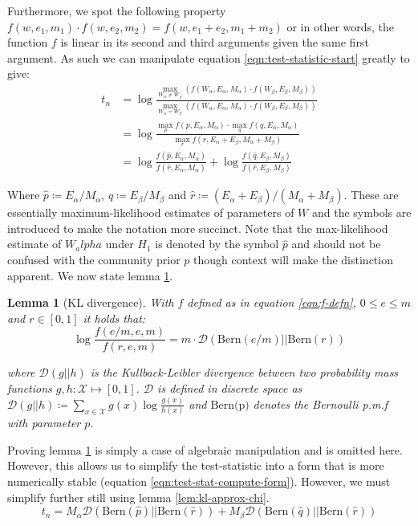 \documentclass[]{article}
\newcommand{\Xcal}{\mathcal{X}}
\newcommand{\kl}{\mathcal{D}}
\newtheorem{lemma}[theorem]{Lemma}
\begin{document}
\begin{multicols*}{2}
Furthermore, we spot the following property $f(w, e_1, m_1) \cdot f(w, e_2, m_2) = f(w, e_1 + e_2, m_1 + m_2)$ or in other words, the function $f$ is linear in its second and third arguments given the same first argument. As such we can manipulate equation \ref{eqn:test-statistic-start} greatly to give:
%
\begin{align}
	t_n &= \log \frac
	{
		\max_{W_{\alpha} \neq W_{\beta}}(f (W_\alpha, E_\alpha, M_\alpha) \cdot f (W_\beta, E_\beta, M_\beta))
	}
	{
		\max_{W_\alpha = W_\beta} (f (W_\alpha, E_\alpha, M_\alpha) \cdot f (W_\beta, E_\beta, M_\beta))
	} \nonumber \\
	&= \log \frac{
		\max_p f(p, E_\alpha, M_\alpha) \cdot \max_q f(q, E_\alpha, M_\alpha)
	}{
		\max_r f(r, E_\alpha + E_\beta, M_\alpha + M_\beta)
	} \nonumber \\
	&= \log \frac{f(\hat{p}, E_\alpha, M_\alpha)}{f(\hat{r}, E_\alpha, M_\alpha)} + \log \frac{f(\hat{q}, E_\beta, M_\beta)}{f(\hat{r}, E_\beta, M_\beta)}
\end{align}

Where $\hat{p} \coloneqq E_\alpha / M_\alpha$, $\hat{q} \coloneqq E_\beta / M_\beta$ and $\hat{r} \coloneqq (E_\alpha + E_\beta) / (M_\alpha + M_\beta)$. These are essentially maximum-likelihood estimates of parameters of $W$ and the symbols are introduced to make the notation more succinct. Note that the max-likelihood estimate of $W_alpha$ under $H_1$ is denoted by the symbol $\hat{p}$ and should not be confused with the community prior $p$ though context will make the distinction apparent. We now state lemma \ref{lem:kl-div}.

\begin{lemma}[KL divergence]
	With $f$ defined as in equation \ref{eqn:f-defn}, $0 \leq e \leq m$ and $r \in [0, 1]$ it holds that:
	\begin{equation*}
		\log \frac{f(e/m, e, m)}{f(r, e, m)} = m \cdot \kl \left( \textrm{Bern}(e/m) || \textrm{Bern}(r) \right)
	\end{equation*}

	where $\kl(g || h)$ is the Kullback-Leibler divergence between two probability mass functions $g, h: \Xcal \mapsto [0, 1]$. $\kl$ is defined in discrete space as $\kl(g || h) \coloneqq \sum_{x \in \Xcal} g(x) \log \frac{g(x)}{h(x)}$ and $\textrm{Bern(p)}$ denotes the Bernoulli p.m.f with parameter $p$.
	\label{lem:kl-div}
\end{lemma}

Proving lemma \ref{lem:kl-div} is simply a case of algebraic manipulation and is omitted here. However, this allows us to simplify the test-statistic into a form that is more numerically stable (equation \ref{eqn:test-stat-compute-form}). However, we must simplify further still using lemma \ref{lem:kl-approx-chi}.
%
\begin{equation}
	t_n = M_\alpha \kl\left( \textrm{Bern}(\hat{p}) || \textrm{Bern}(\hat{r})\right) + 
	M_\beta \kl\left( \textrm{Bern}(\hat{q}) || \textrm{Bern}(\hat{r})\right)
	\label{eqn:test-stat-compute-form}
\end{equation}


\end{multicols*}
\end{document}
